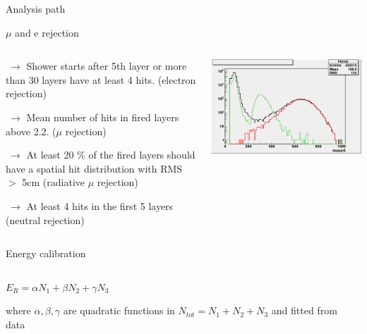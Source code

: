 \documentclass[10pt]{beamer}
\begin{document}
\begin{frame}{Analysis path}
\begin{block}{$\mu$ and e rejection}
\begin{columns}
\begin{column}{0.5\textwidth}
  {\small
    \par $ ~ \rightarrow $ Shower starts after 5th layer or more than 30 layers have at least 4 hits. (electron rejection)
    \par $ ~ \rightarrow $ Mean number of hits in fired layers above 2.2. ($\mu$ rejection)
    \par $ ~ \rightarrow $ At least 20 \% of the fired layers should have a spatial hit distribution with RMS $>$ 5cm (radiative $\mu$ rejection)
    \par $ ~ \rightarrow $ At least 4 hits in the first 5 layers (neutral rejection)   
  }  
\end{column}
\begin{column}{0.5\textwidth}

  \centerline{\includegraphics[height=0.45\textheight]{jpg/pionselection.jpg}}

\end{column}
\end{columns}

\end{block}
\pause
\begin{block}{Energy calibration}
\begin{columns}[t]
\begin{column}{0.5\textwidth}
{\small
 $ E_{R} =\alpha N_1 + \beta N_2 + \gamma N_3 $

where $ \alpha , \beta , \gamma $  are quadratic functions in $ N_{tot}=N_1+N_2+N_3 $ and  fitted from data
}
\end{column}
\begin{column}{0.5\textwidth}


\end{column}
\end{columns}
\end{block}
\end{frame}
\end{document}
